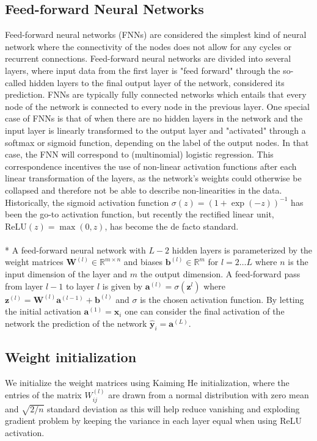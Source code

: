\documentclass[a4paper,11pt]{article}
\begin{document}
\subsection{Feed-forward Neural Networks}
Feed-forward neural networks (FNNs) are considered the simplest kind of neural network where the connectivity of the nodes does not allow for any cycles or recurrent connections. Feed-forward neural networks are divided into several layers, where input data from the first layer is "feed forward" through the so-called hidden layers to the final output layer of the network, considered its prediction. FNNs are typically fully connected networks which entails that every node of the network is connected to every node in the previous layer. One special case of FNNs is that of when there are no hidden layers in the network and the input layer is linearly transformed to the output layer and "activated" through a softmax or sigmoid function, depending on the label of the output nodes. In that case, the FNN will correspond to (multinomial) logistic regression. This correspondence incentives the use of non-linear activation functions after each linear transformation of the layers, as the network's weights could otherwise be collapsed and therefore not be able to describe non-linearities in the data. Historically, the sigmoid activation function $\sigma(z) = (1 + \exp(-z))^{-1}$ has been the go-to activation function, but recently the rectified linear unit, $\textrm{ReLU}(z) = \max(0, z)$, has become the de facto standard. \\
\\*
A feed-forward neural network with $L-2$ hidden layers is parameterized by the weight matrices $\mathbf{W}^{(l)} \in \mathbb{R}^{m \times n}$ and biases $\mathbf{b}^{(l)} \in  \mathbb{R}^{m}$ for $l = 2 \ldots L$ where $n$ is the input dimension of the layer and $m$ the output dimension. A feed-forward pass from layer $l-1$ to layer $l$ is given by $\mathbf{a}^{(l)} = \sigma(\mathbf{z}^{l})$ where $\mathbf{z}^{(l)} = \mathbf{W}^{(l)} \mathbf{a}^{(l-1)} + \mathbf{b}^{(l)}$ and $\sigma$ is the chosen activation function. By letting the initial activation $\mathbf{a}^{(1)} = \mathbf{x}_i$ one can consider the final activation of the network the prediction of the network $\mathbf{\hat{y}}_i = \mathbf{a}^{(L)}$.

\subsection{Weight initialization}
We initialize the weight matrices using Kaiming He initialization, where the entries of the matrix $W^{(l)}_{ij}$ are drawn from a normal distribution with zero mean and $\sqrt{2/n}$ standard deviation as this will help reduce vanishing and exploding gradient problem by keeping the variance in each layer equal when using ReLU activation. \cite{he2015delving}
\end{document}
